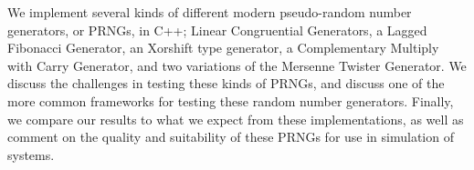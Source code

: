 We implement several kinds of different modern pseudo-random number generators, or PRNGs, in C++; Linear Congruential Generators, a Lagged Fibonacci Generator, an Xorshift type generator, a Complementary Multiply with Carry Generator, and two variations of the Mersenne Twister Generator. We discuss the challenges in testing these kinds of PRNGs, and discuss one of the more common frameworks for testing these random number generators. Finally, we compare our results to what we expect from these implementations, as well as comment on the quality and suitability of these PRNGs for use in simulation of systems.
